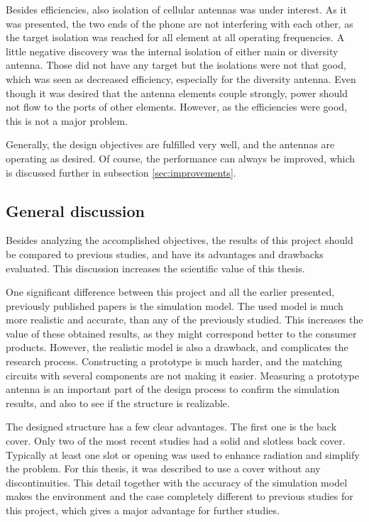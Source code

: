 Besides efficiencies, also isolation of cellular antennas was under interest. As it was presented, the two ends of the phone are not interfering with each other, as the target isolation was reached for all element at all operating frequencies. A little negative discovery was the internal isolation of either main or diversity antenna. Those did not have any target but the isolations were not that good, which was seen as decreased efficiency, especially for the diversity antenna. Even though it was desired that the antenna elements couple strongly, power should not flow to the ports of other elements. However, as the efficiencies were good, this is not a major problem.

Generally, the design objectives are fulfilled very well, and the antennas are operating as desired. Of course, the performance can always be improved, which is discussed further in subsection \ref{sec:improvements}.


\subsection{General discussion}
\label{sec:general_discussion}
Besides analyzing the accomplished objectives, the results of this project should be compared to previous studies, and have its advantages and drawbacks evaluated. This discussion increases the scientific value of this thesis.

One significant difference between this project and all the earlier presented, previously published papers is the simulation model. The used model is much more realistic and accurate, than any of the previously studied. This increases the value of these obtained results, as they might correspond better to the consumer products. However, the realistic model is also a drawback, and complicates the research process. Constructing a prototype is much harder, and the matching circuits with several components are not making it easier. Measuring a prototype antenna is an important part of the design process to confirm the simulation results, and also to see if the structure is realizable.

The designed structure has a few clear advantages. The first one is the back cover. Only two of the most recent studies had a solid and slotless back cover. Typically at least one slot or opening was used to enhance radiation and simplify the problem. For this thesis, it was described to use a cover without any discontinuities. This detail together with the accuracy of the simulation model makes the environment and the case completely different to previous studies for this project, which gives a major advantage for further studies. 

